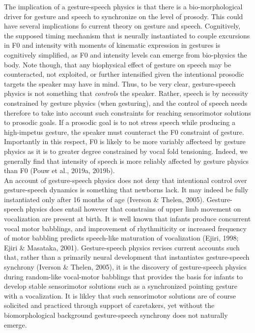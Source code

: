 \documentclass[
  man, noextraspace,floatsintext]{apa6}
\begin{document}
The implication of a gesture-speech physics is that there is a bio-morphological driver for gesture and speech to synchronize on the level of prosody. This could have several implications fo current theory on gesture and speech. Cognitively, the supposed timing mechanism that is neurally instantiated to couple excursions in F0 and intensity with moments of kinematic expression in gestures is cognitively simplified, as F0 and intensity levels can emerge from bio-physics the body. Note though, that any biophysical effect of gesture on speech may be counteracted, not exploited, or further intensified given the intentional prosodic targets the speaker may have in mind. Thus, to be very clear, gesture-speech physics is not something that \emph{controls} the speaker. Rather, speech is by necessity constrained by gesture physics (when gesturing), and the control of speech needs therefore to take into account such constraints for reaching sensorimotor solutions to prosodic goals. If a prosodic goal is to not stress speech while producing a high-impetus gesture, the speaker must counteract the F0 constraint of gesture. Importantly in this respect, F0 is likely to be more variably affecteed by gesture physics as it is to greater degree constrained by vocal fold tensioning. Indeed, we generally find that intensity of speech is more reliably affected by gesture physics than F0 (Pouw et al., 2019a, 2019b).\\
An account of gesture-speech physics does not deny that intentional control over gesture-speech dynamics is something that newborns lack. It may indeed be fully instantiated only after 16 months of age (Iverson \& Thelen, 2005). Gesture-speech physics does entail however that constrains of upper limb movement on vocalization are present at birth. It is well known that infants produce concurrent vocal motor babblings, and improvement of rhythmiticity or increased frequency of motor babbling predicts speech-like maturation of vocalization (Ejiri, 1998; Ejiri \& Masataka, 2001). Gesture-speech physics revises current accounts such that, rather than a primarily neural development that instantiates gesture-speech synchrony (Iverson \& Thelen, 2005), it is the discovery of gesture-speech physics during random-like vocal-motor babblings that provides the basis for infants to develop stable sensorimotor solutions such as a synchronized pointing gesture with a vocalization. It is likley that such sensorimotor solutions are of course solicited and practiced through support of caretakers, yet without the biomorphological background gesture-speech synchrony does not naturally emerge.\\
\end{document}
